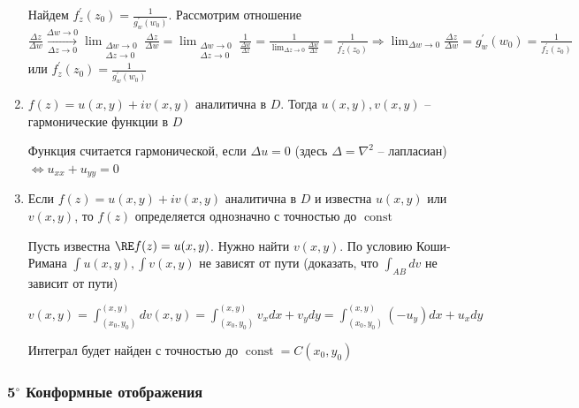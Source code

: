 \begin{enumerate}[label=\arabic*$^\circ$]
\begin{MyProof}
        Найдем $f^\prime_z(z_0) = \frac{1}{g^\prime_w(w_0)}$. 
        Рассмотрим отношение $\frac{\Delta z}{\Delta w} \underset{\Delta z \to 0}{\overset{\Delta w \to 0}{\longrightarrow}} 
        \lim_{\substack{\Delta w \to 0 \\ \Delta z \to 0}} \frac{\Delta z}{\Delta w} = \lim_{\substack{\Delta w \to 0 \\ \Delta z \to 0}} \frac{1}{\frac{\Delta w}{\Delta z}} = 
        \frac{1}{\lim_{\Delta z \to 0} \frac{\Delta w}{\Delta z}} = \frac{1}{f^\prime_z (z_0)} \Longrightarrow \lim_{\Delta w \to 0} \frac{\Delta z}{\Delta w} = g^\prime_w(w_0) = \frac{1}{f^\prime_z(z_0)}$ или $f^\prime_z(z_0) = \frac{1}{g^\prime_w(w_0)}$
    \end{MyProof}

    \item $f(z) = u(x, y) + i v(x, y)$ аналитична в $D$. Тогда $u(x, y), v(x, y)$ -- гармонические функции в $D$

    \begin{MyProof}
        Функция считается гармонической, если $\Delta u = 0$ (здесь $\Delta = \nabla^2$ -- лапласиан) $\Longleftrightarrow u_{xx} + u_{yy} = 0$
        
        \Lab
    \end{MyProof}

    \item Если $f(z) = u(x, y) + i v(x, y)$ аналитична в $D$ и известна $u(x, y)$ или $v(x, y)$, то $f(z)$ определяется однозначно с точностью до $\operatorname{const}$

    \begin{MyProof}
        Пусть известна $\RE f(z) = u(x, y)$. Нужно найти $v(x, y)$. По условию Коши-Римана $\int u(x, y), \int v(x, y)$ не зависят от пути
        (\Lab доказать, что $\int_{AB} dv$ не зависит от пути)

        $v(x, y) = \int_{(x_0, y_0)}^{(x, y)} dv(x, y) = \int_{(x_0, y_0)}^{(x, y)} v_x dx + v_y dy = \int_{(x_0, y_0)}^{(x, y)} (-u_y) dx + u_x dy$

        Интеграл будет найден с точностью до $\operatorname{const} = C(x_0, y_0)$
    \end{MyProof}

\end{enumerate}


\subsubsection{5$^\circ$ Конформные отображения}


